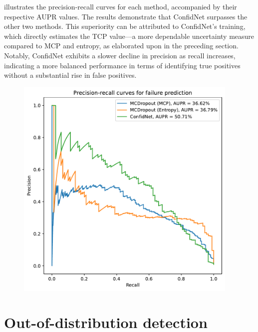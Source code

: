  illustrates the precision-recall curves for each method, accompanied by their respective AUPR values. The results demonstrate that ConfidNet surpasses the other two methods. This superiority can be attributed to ConfidNet's training, which directly estimates the TCP value—a more dependable uncertainty measure compared to MCP and entropy, as elaborated upon in the preceding section. Notably, ConfidNet exhibits a slower decline in precision as recall increases, indicating a more balanced performance in terms of identifying true positives without a substantial rise in false positives.

\begin{figure}[H]
    \centering
    \includegraphics[width=0.95\textwidth]{failure_aupr.pdf}
    \caption{}
    \label{fig:failure_aupr}
\end{figure}

\section{Out-of-distribution detection}

